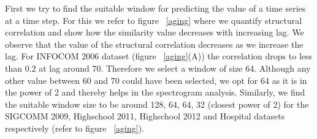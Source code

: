 First we try to find the suitable window for predicting the value of a time series at a time step. For this we refer to figure ~\ref{aging} where 
we quantify structural correlation and show how the similarity value decreases with increasing lag.
We observe that the value of the structural correlation decreases as we increase the lag. For INFOCOM 2006 dataset (figure ~\ref{aging}(A)) the correlation drops to less than 
$0.2$ at lag around $70$.
Therefore we select a window of size 64. 
Although any other value between 60 and 70 could have been selected, we opt for 64 as it is in the power of 2 and thereby helps in the spectrogram 
analysis. Similarly, we find the suitable window size to be around 128, 64, 64, 32 (closest power of 2) 
for the SIGCOMM 2009, Highschool 2011, Highschool 2012 and Hospital datasets respectively (refer to figure ~\ref{aging}). 
